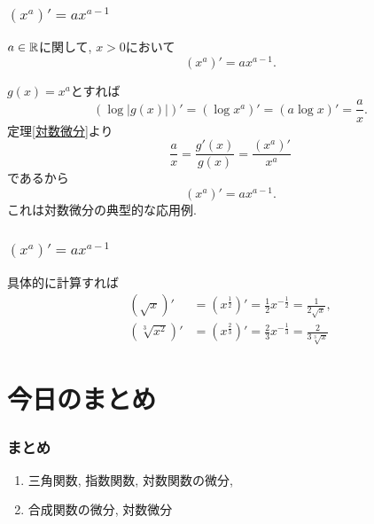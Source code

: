 

\begin{frame}
\frametitle{$(x^a)'=ax^{a-1}$}



\begin{Thm} 
$a \in \mathbb{R}$に関して, $x>0$において
$$
(x^a)'=ax^{a-1}.
$$
\end{Thm}
$g(x)=x^a$とすれば
$$
(\log |g(x)|)'= (\log x^a)'= (a \log x)'=\frac{a}{x}. 
$$
定理\ref{対数微分}より
$$
\frac{a}{x}=\frac{g'(x)}{g(x)}=\frac{(x^a)'}{x^a}
$$
であるから
$$
(x^a)'=a x^{a-1}. 
$$
これは対数微分の典型的な応用例. 

\end{frame}




\begin{frame}
\frametitle{$(x^a)'=ax^{a-1}$}


具体的に計算すれば
\begin{align*}
(\sqrt{x})' &= (x^{\frac{1}{2}})'=\frac{1}{2}x^{-\frac{1}{2}}= \frac{1}{2 \sqrt{x}}, \\
(\sqrt[3]{x^2})' &= (x^{\frac{2}{3}})'=\frac{2}{3}x^{-\frac{1}{3}}= \frac{2}{3 \sqrt[3]{x}}
\end{align*}


\end{frame}







\section{今日のまとめ}
\begin{frame}
\frametitle{まとめ}   


\begin{enumerate}
\item 三角関数, 指数関数, 対数関数の微分,
\item 合成関数の微分, 対数微分
\end{enumerate} 


\end{frame}
